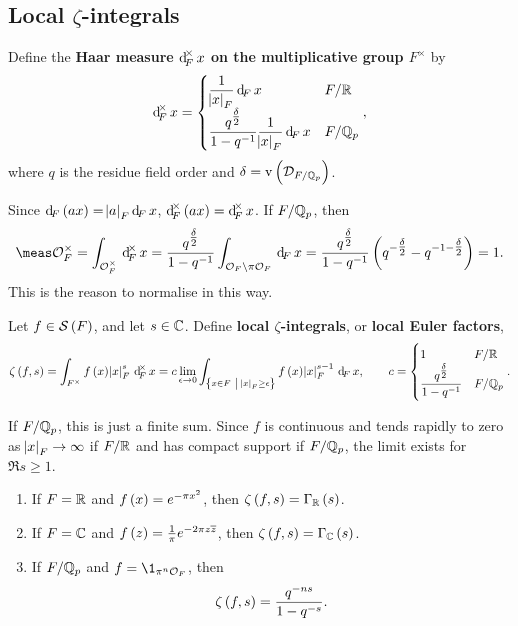 \subsection{Local \texorpdfstring{$ \zeta $}{zeta}-integrals}


\begin{definition*}
Define the \textbf{Haar measure $ \dF^\times x $ on the multiplicative group $ F^\times $} by
$$ \dF^\times x =
\begin{cases}
\dfrac{1}{\abs{x}_F}\dF x & F / \RR \\
\dfrac{q^{\tfrac{\delta}{2}}}{1 - q^{-1}}\dfrac{1}{\abs{x}_F}\dF x & F / \QQ_p
\end{cases},
$$
where $ q $ is the residue field order and $ \delta = \v\br{\DDD_{F / \QQ_p}} $.
\end{definition*}

Since $ \dF\br{ax} = \abs{a}_F\dF x $, $ \dF^\times\br{ax} = \dF^\times x $. If $ F / \mathbb{Q}_p $, then
$$ \meas \OOO_F^\times = \intFX[\OOO_F^\times]{}{x} = \dfrac{q^{\tfrac{\delta}{2}}}{1 - q^{-1}}\intF[\OOO_F \setminus \pi\OOO_F]{}{x} = \dfrac{q^{\tfrac{\delta}{2}}}{1 - q^{-1}}\br{q^{-\tfrac{\delta}{2}} - q^{-1 - \tfrac{\delta}{2}}} = 1. $$
This is the reason to normalise in this way.

\begin{definition*}
Let $ f \in \SSS\br{F} $, and let $ s \in \mathbb{C} $. Define \textbf{local $ \zeta $-integrals}, or \textbf{local Euler factors},
$$ \zeta\br{f, s} = \intFX{f\br{x}\abs{x}_F^s}{x} = c\lim_{\epsilon \to 0} \intF[\cbr{x \in F \st \abs{x}_F \ge \epsilon}]{f\br{x}\abs{x}_F^{s - 1}}{x}, \qquad c =
\begin{cases}
1 & F / \RR \\
\dfrac{q^{\tfrac{\delta}{2}}}{1 - q^{-1}} & F / \QQ_p
\end{cases}.
$$
\end{definition*}

If $ F / \mathbb{Q}_p $, this is just a finite sum. Since $ f $ is continuous and tends rapidly to zero as $ \abs{x}_F \to \infty $ if $ F / \mathbb{R} $ and has compact support if $ F / \mathbb{Q}_p $, the limit exists for $ \Re s \ge 1 $.

\begin{proposition}
\label{prop:9.8}
\hfill
\begin{enumerate}
\item If $ F = \mathbb{R} $ and $ f\br{x} = e^{-\pi x^2} $, then $ \zeta\br{f, s} = \Gamma_\RR\br{s} $.
\item If $ F = \mathbb{C} $ and $ f\br{z} = \tfrac{1}{\pi}e^{-2\pi z\overline{z}} $, then $ \zeta\br{f, s} = \Gamma_\CC\br{s} $.
\item If $ F / \mathbb{Q}_p $ and $ f = \1_{\pi^n\OOO_F} $, then
$$ \zeta\br{f, s} = \dfrac{q^{-ns}}{1 - q^{-s}}. $$
\end{enumerate}
\end{proposition}

